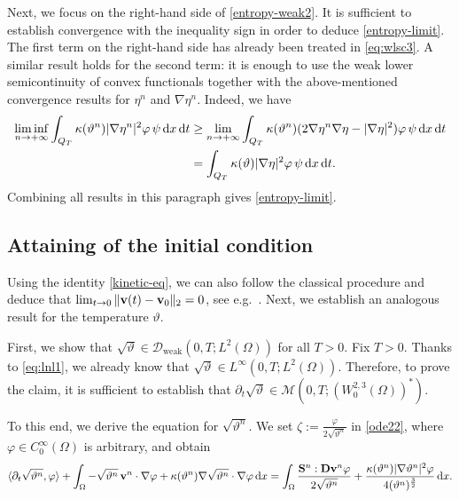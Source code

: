 \documentclass[11pt, a4paper, reqno]{amsart}
\newcommand{\dual}[2]{\langle #1,#2\rangle}
\numberwithin{equation}{section}
\newcommand{\vc}[1]{{\bf #1}}
\newcommand{\vv}{\vc{v}}
\newcommand{\thet}{\vartheta}
\renewcommand{\S}{\mathbf{S}}
\newcommand{\D}{\mathbf{D}}
\newcommand{\dt}{\,{\rm d} t }
\newcommand{\dx}{\,{\rm d} {x}}
\newcommand{\dxdt}{\dx  \dt}
\newcommand{\intO}[1]{\int_{\Omega} #1 \dx}
\newcommand{\pk}[1]{{\color{red}#1}}
\begin{document}
Next, we focus on the right-hand side of \eqref{entropy-weak2}. 
It is sufficient to establish convergence with the inequality sign in order to deduce \eqref{entropy-limit}. 
The first term on the right-hand side has already been treated in \eqref{eq:wlsc3}. 
A similar result holds for the second term: it is enough to use the weak lower semicontinuity of convex functionals together with the above-mentioned convergence results for $\eta^n$ and $\nabla \eta^n$. 
Indeed, we have
$$
\begin{aligned}
\liminf_{n\to+\infty}\int_{Q_T}\kappa(\thet^n)|\nabla\eta^n|^2\varphi\, \psi \dxdt &\geq\lim_{n\to+\infty}\int_{Q_T}\kappa(\thet^n)(2\nabla\eta^n\nabla\eta-|\nabla\eta|^2)\varphi\, \psi \dxdt \\
&=\int_{Q_T}\kappa(\thet)|\nabla\eta|^2\varphi\, \psi \dxdt.
\end{aligned}
$$
Combining all results in this paragraph gives \eqref{entropy-limit}.




\subsection{Attaining of the initial condition}\label{sec:initial}
Using the identity \eqref{kinetic-eq}, we can also follow the classical procedure and deduce that 
$\lim_{t\to0}\|\vv(t)-\vv_0\|_{2}=0$, see e.g.~\cite[Corollary~4.7]{RoRoSa2016}. 
Next, we establish an analogous result for the temperature $\thet$. 

First, we show that $\sqrt{\vartheta} \in \mathcal{D}_{\textrm{weak}}(0,T; L^2(\Omega))$ for all $T>0$. Fix $T>0$. Thanks to \eqref{eq:lnl1}, we already know that $\sqrt{\vartheta}\in L^{\infty}(0,T; L^2(\Omega))$. 
Therefore, to prove the claim, it is sufficient to establish that 
$\partial_t \sqrt{\vartheta} \in \mathcal{M}(0,T; (W^{2,3}_0(\Omega))^*)$. 

To this end, we derive the equation for $\sqrt{\vartheta^n}$. 
We set $\zeta:=\frac{\varphi}{2\sqrt{\vartheta^n}}$ in \eqref{ode22}, 
where \pk{$\varphi\in C^\infty_0(\Omega)$} is arbitrary, and obtain
\begin{equation}\label{ode222}
\dual{\partial_t\sqrt{\vartheta^{n}}}{\varphi} 
+ \intO{-\sqrt{\vartheta^{n}}\, \vv^{n} \cdot \nabla \varphi 
+ \kappa(\vartheta^n)\nabla \sqrt{\vartheta^{n}}\cdot \nabla \varphi} 
= \intO{\frac{\S^{n}: \D\vv^{n}\varphi}{2\sqrt{\vartheta^n}} 
+\frac{\kappa(\vartheta^n)|\nabla\vartheta^{n}|^2\varphi}{4 (\vartheta^n)^{\frac32}}}.
\end{equation}
\end{document}

